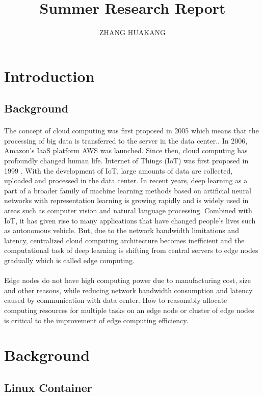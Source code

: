 \documentclass{article}
\title{Summer Research Report}
\author{ZHANG HUAKANG}
\begin{document}
    \maketitle
    \section{Introduction}
        \subsection{Background}
            \paragraph{}
            The concept of cloud computing was first proposed in 2005 \cite{armbrust2010view} which means that the processing of big data is transferred to the server in the data center.. In 2006, Amazon's IaaS platform AWS was launched. Since then, cloud computing has profoundly changed human life. Internet of Things (IoT) was first proposed in 1999 \cite{iot}. With the development of IoT, large amounts of data are collected, uploaded and processed in the data center. In recent years, deep learning as a part of a broader family of machine learning methods based on artificial neural networks with representation learning is growing rapidly and is widely used in areas such as computer vision and natural language processing. Combined with IoT, it has given rise to many applications that have changed people's lives such as autonomous vehicle. But, due to the network bandwidth limitations and latency, centralized cloud computing architecture becomes inefficient and the computational task of deep learning is shifting from central servers to edge nodes gradually which is called edge computing. 
            \paragraph{}
            Edge nodes do not have high computing power due to manufacturing cost, size and other reasons, while reducing network bandwidth consumption and latency caused by communication with data center. How to reasonably allocate computing resources for multiple tasks on an edge node or cluster of edge nodes is critical to the improvement of edge computing efficiency.
    \section{Background}
        \subsection{Linux Container}
\end{document}
